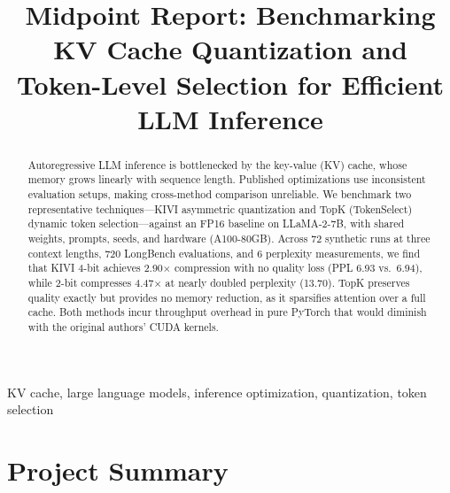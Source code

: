 \documentclass[conference]{IEEEtran}
\begin{document}
\title{Midpoint Report: Benchmarking KV Cache Quantization and Token-Level Selection for Efficient LLM Inference}

\author{
}

\maketitle

\begin{abstract}
Autoregressive LLM inference is bottlenecked by the key-value (KV) cache, whose memory grows linearly with sequence length. Published optimizations use inconsistent evaluation setups, making cross-method comparison unreliable. We benchmark two representative techniques---KIVI asymmetric quantization and TopK (TokenSelect) dynamic token selection---against an FP16 baseline on LLaMA-2-7B, with shared weights, prompts, seeds, and hardware (A100-80GB). Across 72 synthetic runs at three context lengths, 720 LongBench evaluations, and 6 perplexity measurements, we find that KIVI 4-bit achieves 2.90$\times$ compression with no quality loss (PPL 6.93 vs.\ 6.94), while 2-bit compresses 4.47$\times$ at nearly doubled perplexity (13.70). TopK preserves quality exactly but provides no memory reduction, as it sparsifies attention over a full cache. Both methods incur throughput overhead in pure PyTorch that would diminish with the original authors' CUDA kernels.
\end{abstract}

\begin{IEEEkeywords}
KV cache, large language models, inference optimization, quantization, token selection
\end{IEEEkeywords}

\section{Project Summary}
\end{document}
